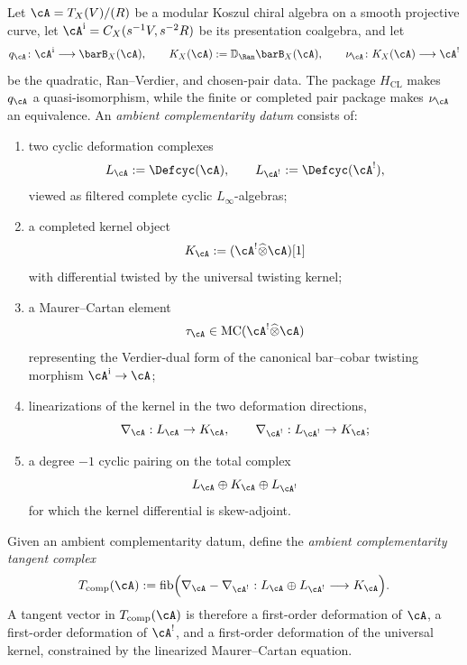 \begin{definition}
\label{def:nms-ambient-datum}
Let $\cA=T_X(V)/(R)$ be a modular Koszul chiral algebra on a smooth
projective curve, let
$\cA^{\mathrm i}=C_X(s^{-1}V,s^{-2}R)$ be its presentation
coalgebra, and let
\[
q_\cA\colon\cA^{\mathrm i}\longrightarrow\barB_X(\cA),\qquad
K_X(\cA):=\mathbb D_{\Ran}\barB_X(\cA),\qquad
\nu_\cA\colon K_X(\cA)\longrightarrow\cA^!
\]
be the quadratic, Ran--Verdier, and chosen-pair data.  The package
$H_{\mathrm{CL}}$ makes $q_\cA$ a quasi-isomorphism, while the
finite or completed pair package makes $\nu_\cA$ an equivalence.
An \emph{ambient complementarity datum}
consists of:
\begin{enumerate}[label=\textup{(\roman*)}]
\item two cyclic deformation complexes
\[
L_{\cA}:=\Defcyc(\cA),\qquad L_{\cA^!}:=\Defcyc(\cA^!),
\]
viewed as filtered complete cyclic $L_\infty$-algebras;
\item a completed kernel object
\[
K_{\cA}:=(\cA^!\widehat\otimes \cA)[1]
\]
with differential twisted by the universal twisting kernel;
\item a Maurer--Cartan element
\[
\tau_{\cA}\in \mathrm{MC}(\cA^!\widehat\otimes \cA)
\]
representing the Verdier-dual form of the canonical bar--cobar
twisting morphism $\cA^{\mathrm i}\to\cA$;
\item linearizations of the kernel in the two deformation directions,
\[
\nabla_{\cA}:L_{\cA}\to K_{\cA},
\qquad
\nabla_{\cA^!}:L_{\cA^!}\to K_{\cA};
\]
\item a degree $-1$ cyclic pairing on the total complex
\[
L_{\cA}\oplus K_{\cA}\oplus L_{\cA^!}
\]
for which the kernel differential is skew-adjoint.
\end{enumerate}
\end{definition}

\begin{definition}
\label{def:nms-ambient-tangent-complex}
Given an ambient complementarity datum, define the \emph{ambient complementarity tangent complex}
\begin{equation}
\label{eq:nms-ambient-tangent}
T_{\mathrm{comp}}(\cA)
:=
\mathrm{fib}\Bigl(
\nabla_{\cA}-\nabla_{\cA^!}:
L_{\cA}\oplus L_{\cA^!}\longrightarrow K_{\cA}
\Bigr).
\end{equation}
A tangent vector in $T_{\mathrm{comp}}(\cA)$ is therefore a first-order deformation of $\cA$, a first-order deformation of $\cA^!$, and a first-order deformation of the universal kernel, constrained by the linearized Maurer--Cartan equation.
\end{definition}


